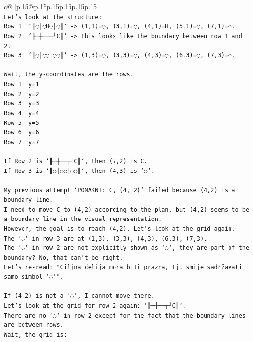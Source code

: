 \documentclass{article}
\begin{document}
{\begin{supertabular}{c@{$\;$}|p{.15\linewidth}@{}p{.15\linewidth}p{.15\linewidth}p{.15\linewidth}p{.15\linewidth}p{.15\linewidth}}
{{{\\ 
\texttt{Let's look at the structure:} \\
\texttt{Row 1: `║◌│◌H◌│◌║` {-}> (1,1)=◌, (3,1)=◌, (4,1)=H, (5,1)=◌, (7,1)=◌.} \\
\texttt{Row 2: `╟─┼──┬┘C║` {-}> This looks like the boundary between row 1 and 2.} \\
\texttt{Row 3: `║◌│◌◌│◌◌║` {-}> (1,3)=◌, (3,3)=◌, (4,3)=◌, (6,3)=◌, (7,3)=◌.} \\
\\ 
\texttt{Wait, the y{-}coordinates are the rows.} \\
\texttt{Row 1: y=1} \\
\texttt{Row 2: y=2} \\
\texttt{Row 3: y=3} \\
\texttt{Row 4: y=4} \\
\texttt{Row 5: y=5} \\
\texttt{Row 6: y=6} \\
\texttt{Row 7: y=7} \\
\\ 
\texttt{If Row 2 is `╟─┼──┬┘C║`, then (7,2) is C.} \\
\texttt{If Row 3 is `║◌│◌◌│◌◌║`, then (4,3) is `◌`.} \\
\\ 
\texttt{My previous attempt `POMAKNI: C, (4, 2)` failed because (4,2) is a boundary line.} \\
\texttt{I need to move C to (4,2) according to the plan, but (4,2) seems to be a boundary line in the visual representation.} \\
\texttt{However, the goal is to reach (4,2). Let's look at the grid again.} \\
\texttt{The `◌` in row 3 are at (1,3), (3,3), (4,3), (6,3), (7,3).} \\
\texttt{The `◌` in row 2 are not explicitly shown as `◌`, they are part of the boundary? No, that can't be right.} \\
\texttt{Let's re{-}read: "Ciljna ćelija mora biti prazna, tj. smije sadržavati samo simbol '◌'".} \\
\\ 
\texttt{If (4,2) is not a `◌`, I cannot move there.} \\
\texttt{Let's look at the grid for row 2 again: `╟─┼──┬┘C║`.} \\
\texttt{There are no `◌` in row 2 except for the fact that the boundary lines are between rows.} \\
\texttt{Wait, the grid is:} \\
}}}
\end{supertabular}}
\end{document}

